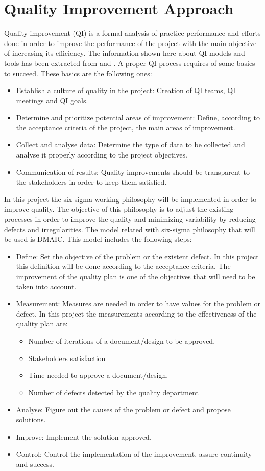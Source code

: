 \section{Quality Improvement Approach}
Quality improvement (QI) is a formal analysis of practice performance and efforts done in order to improve the performance of the project with the main objective of increasing its efficiency. The information shown here about QI models and tools has been extracted from \cite{aafp} and \cite{leansolutions}. A proper QI process requires of some basics to succeed. These basics are the following ones:
\begin{itemize}
\item Establish a culture of quality in the project: Creation of QI teams, QI meetings and QI goals.
\item Determine and prioritize potential areas of improvement: Define, according to the acceptance criteria of the project, the main areas of improvement.
\item Collect and analyse data: Determine the type of data to be collected and analyse it properly according to the project objectives.
\item Communication of results: Quality improvements should be transparent to the stakeholders in order to keep them satisfied. 
\end{itemize}
In this project the six-sigma working philosophy will be implemented in order to improve quality. The objective of this philosophy is to adjust the existing processes in order to improve the quality and minimizing variability by reducing defects and irregularities. The model related with six-sigma philosophy that will be used is DMAIC. This model includes the following steps:
\begin{itemize}
\item Define: Set the objective of the problem or the existent defect. In this project this definition will be done according to the acceptance criteria. The improvement of the quality plan is one of the objectives that will need to be taken into account.
\item Measurement: Measures are needed in order to have values for the problem or defect. In this project the measurements according to the effectiveness of the quality plan are:
\begin{itemize}
\item Number of iterations of a document/design to be approved.
\item Stakeholders satisfaction
\item Time needed to approve a document/design.
\item Number of defects detected by the quality department
\end{itemize}
\item Analyse: Figure out the causes of the problem or defect and propose solutions.
\item Improve: Implement the solution approved.
\item Control: Control the implementation of the improvement, assure continuity and success.
\end{itemize}